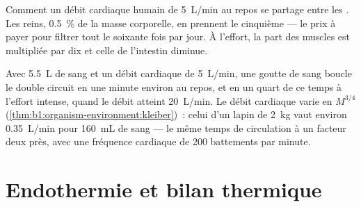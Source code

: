 \begin{omfigure}

{\small Comment un débit cardiaque humain de \qty{5}{L/min} au repos se
partage entre les . Les reins, \qty{0.5}{\%} de la masse
corporelle, en prennent le cinquième --- le prix à payer pour filtrer
tout le  soixante fois par jour. À l'effort, la part des muscles
est multipliée par dix et celle de l'intestin diminue.}
\end{omfigure}

\begin{example}\label{ex:b1:mammal-organization:circtime}
Avec \qty{5.5}{L} de sang et un débit cardiaque de \qty{5}{L/min}, une
goutte de sang boucle le double circuit en une minute environ au repos,
et en un quart de ce temps à l'effort intense, quand le débit atteint
\qty{20}{L/min}. Le débit cardiaque varie en $M^{3/4}$
(\cref{thm:b1:organism-environment:kleiber})~: celui d'un lapin de
\qty{2}{kg} vaut environ \qty{0.35}{L/min} pour \qty{160}{mL} de sang
--- le même temps de circulation à un facteur deux près, avec une
fréquence cardiaque de \qty{200}{} battements par minute.
\end{example}

\section{Endothermie et bilan thermique}

